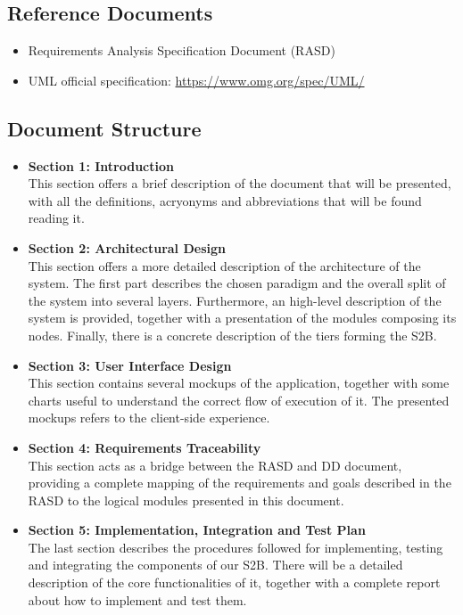 \documentclass[table, 12pt]{article}
\begin{document}
\subsection{Reference Documents}
\begin{itemize}
    \item Requirements Analysis Specification Document (RASD)
    \item UML official specification: \href{https://www.omg.org/spec/UML/}{https://www.omg.org/spec/UML/}
\end{itemize}

\subsection{Document Structure}
\begin{itemize}
    \item \textbf{Section 1: Introduction}\\This section offers a brief description of the document that will be presented, with all the definitions, acryonyms and abbreviations that will be found reading it.
    \item \textbf{Section 2: Architectural Design}\\This section offers a more detailed description of the architecture of the system. The first part describes the chosen paradigm and the overall split of the system into several layers. Furthermore, an high-level description of the system is provided, together with a presentation of the modules composing its nodes. Finally, there is a concrete description of the tiers forming the S2B.
    \item \textbf{Section 3: User Interface Design}\\This section contains several mockups of the application, together with some charts useful to understand the correct flow of execution of it. The presented mockups refers to the client-side experience.
    \item \textbf{Section 4: Requirements Traceability}\\This section acts as a bridge between the RASD and DD document, providing a complete mapping of the requirements and goals described in the RASD to the logical modules presented in this document.
    \item \textbf{Section 5: Implementation, Integration and Test Plan}\\The last section describes the procedures followed for implementing, testing and integrating the components of our S2B. There will be a detailed description of the core functionalities of it, together with a complete report about how to implement and test them.
\end{itemize}
\end{document}
